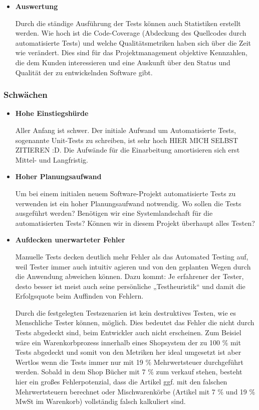 \begin{itemize}
	\item \textbf{Auswertung}
	
	Durch die ständige Ausführung der Tests können auch Statistiken erstellt werden. Wie hoch ist die Code-Coverage (Abdeckung des Quellcodes durch automatisierte Tests) und welche Qualitätsmetriken haben sich über die Zeit wie verändert. Dies sind für das Projektmanagement objektive Kennzahlen, die dem Kunden interessieren und eine Auskunft über den Status und Qualität der zu entwickelnden Software gibt.

\end{itemize}

\subsubsection{Schwächen}
\begin{itemize}	
	\item \textbf{Hohe Einstiegshürde}
	
	Aller Anfang ist schwer. Der initiale Aufwand um Automatisierte Tests, sogenannte Unit-Tests zu schreiben, ist sehr hoch HIER MICH SELBST ZITIEREN :D. Die Aufwände für die Einarbeitung amortisieren sich erst Mittel- und Langfristig.
	
	\item \textbf{Hoher Planungsaufwand}
	
	Um bei einem initialen neuem Software-Projekt automatisierte Tests zu verwenden ist ein hoher Planungsaufwand notwendig. Wo sollen die Tests ausgeführt werden? Benötigen wir eine Systemlandschaft für die automatisierten Tests? Können wir in diesem Projekt überhaupt alles Testen?
	
	\item \textbf{Aufdecken unerwarteter Fehler}
	
	Manuelle Tests decken deutlich mehr Fehler als das Automated Testing auf, weil Tester immer auch intuitiv agieren und von den geplanten Wegen durch die Anwendung abweichen können. Dazu kommt: Je erfahrener der Tester, desto besser ist meist auch seine persönliche „Testheuristik“ und damit die Erfolgsquote beim Auffinden von Fehlern.
	
	Durch die festgelegten Testszenarien ist kein destruktives Testen, wie es Menschliche Tester können, möglich. Dies bedeutet das Fehler die nicht durch Tests abgedeckt sind, beim Entwickler auch nicht erscheinen. Zum Beisiel wäre ein Warenkorbprozess innerhalb eines Shopsystem der zu 100 \% mit Tests abgedeckt und somit von den Metriken her ideal umgesetzt ist aber Wertlos wenn die Tests immer nur mit 19 \% Mehrwertsteuer durchgeführt werden. Sobald in dem Shop Bücher mit 7 \% zum verkauf stehen, besteht hier ein großes Fehlerpotenzial, dass die Artikel ggf. mit den falschen Mehrwertsteuern berechnet oder Mischwarenkörbe (Artikel mit 7 \% und 19 \% MwSt im Warenkorb) vollständig falsch kalkuliert sind. 
	
\end{itemize}

